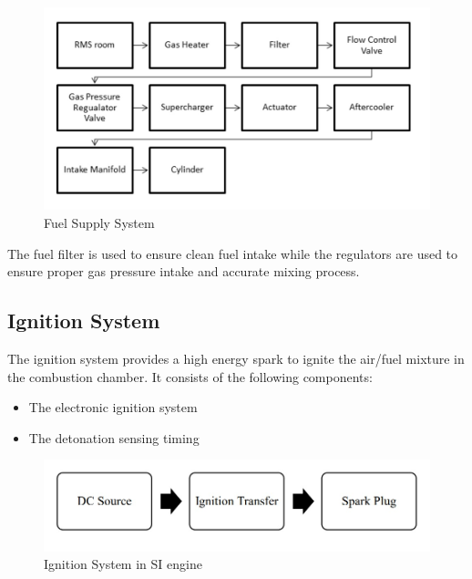 \documentclass[12pt]{article}
\begin{document}
          \begin{figure}[H]
            \begin{center}
              \includegraphics[width=0.98\linewidth]{img/fuel_supply.jpeg}
              \caption{Fuel Supply System}
            \end{center}
          \end{figure}


          The fuel filter is used to ensure clean fuel intake while the regulators are used to ensure proper gas pressure intake and accurate mixing process. 


          \subsection*{Ignition System}
          The ignition system provides a high energy spark to ignite the air/fuel mixture in the combustion chamber. It consists of the following components:
          \begin{itemize}
            \item The electronic ignition system
            \item The detonation sensing timing 
          \end{itemize}

          \begin{figure}[H]
            \begin{center}
              \includegraphics[width=0.8\linewidth]{img/ignition_system.jpeg}
              \caption{Ignition System in SI engine}
            \end{center}
          \end{figure}
\end{document}
